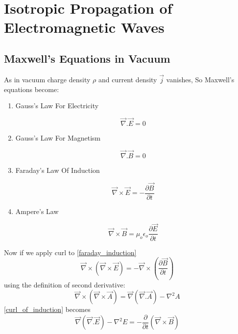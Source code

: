 \chapter{Isotropic Propagation of Electromagnetic Waves}

\section{Maxwell's Equations in Vacuum}

As in vacuum charge density $\rho$ and current density $\vec{j}$ vanishes, So Maxwell's equations become:

\begin{enumerate}

   \item Gauss’s Law For Electricity

      \begin{equation}\label{gauss_law}
      \vec{\nabla}.\vec{E} = 0
      \end{equation}

   \item Gauss’s Law For Magnetism

      \begin{equation}
      \vec{\nabla}.\vec{B} = 0
      \end{equation}

   \item Faraday’s Law Of Induction

      \begin{equation}\label{faraday_induction}
      \vec{\nabla}\times\vec{E} = - \frac{\partial\vec{B}}{\partial t}
      \end{equation}

   \item Ampere’s Law

      \begin{equation}\label{amperes_law}
      \vec{\nabla}\times\vec{B} = \mu_{o}\epsilon_{o}\frac{\partial\vec{E}}{\partial t}
      \end{equation}

\end{enumerate}

Now if we apply curl to \eqref{faraday_induction}
%
   \begin{equation}\label{curl_of_induction}
   \vec{\nabla}\times(\vec{\nabla}\times\vec{E}) = - \vec{\nabla}\times(\frac{\partial\vec{B}}{\partial t})
   \end{equation}
%
using the definition of second derivative:
%
   \begin{equation}
   \vec{\nabla}\times(\vec{\nabla}\times\vec{A}) = \vec{\nabla}(\vec{\nabla}.\vec{A})-{\nabla}^2A
   \end{equation}
%
\eqref{curl_of_induction} becomes
%
   \begin{equation}
   \vec{\nabla}(\vec{\nabla}.\vec{E})-{\nabla}^2E = - \frac{\partial}{\partial t}(\vec{\nabla}\times\vec{B})
   \end{equation}

